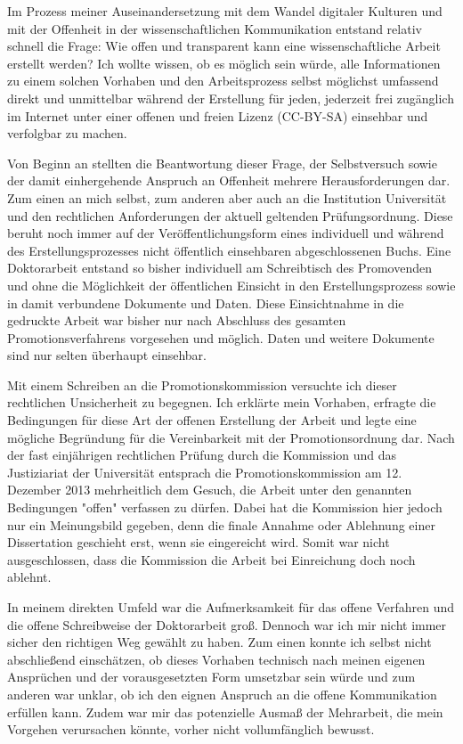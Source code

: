 Im Prozess meiner Auseinandersetzung mit dem Wandel digitaler Kulturen und mit der Offenheit in der wissenschaftlichen Kommunikation entstand relativ schnell die Frage: Wie offen und transparent kann eine wissenschaftliche Arbeit erstellt werden? Ich wollte wissen, ob es möglich sein würde, alle Informationen zu einem solchen Vorhaben und den Arbeitsprozess selbst möglichst umfassend direkt und unmittelbar während der Erstellung für jeden, jederzeit frei zugänglich im Internet unter einer offenen und freien Lizenz (CC-BY-SA) einsehbar und verfolgbar zu machen.

Von Beginn an stellten die Beantwortung dieser Frage, der Selbstversuch sowie der damit einhergehende Anspruch an Offenheit mehrere Herausforderungen dar. Zum einen an mich selbst, zum anderen aber auch an die Institution Universität und den rechtlichen Anforderungen der aktuell geltenden Prüfungsordnung. Diese beruht noch immer auf der Veröffentlichungsform eines individuell und während des Erstellungsprozesses nicht öffentlich einsehbaren abgeschlossenen Buchs. Eine Doktorarbeit entstand so bisher individuell am Schreibtisch des Promovenden und ohne die Möglichkeit der öffentlichen Einsicht in den Erstellungsprozess sowie in damit verbundene Dokumente und Daten. Diese Einsichtnahme in die gedruckte Arbeit war bisher nur nach Abschluss des gesamten Promotionsverfahrens vorgesehen und möglich. Daten und weitere Dokumente sind nur selten überhaupt einsehbar.

Mit einem Schreiben an die Promotionskommission versuchte ich dieser rechtlichen Unsicherheit zu begegnen. Ich erklärte mein Vorhaben, erfragte die Bedingungen für diese Art der offenen Erstellung der Arbeit und legte eine mögliche Begründung für die Vereinbarkeit mit der Promotionsordnung dar. Nach der fast einjährigen rechtlichen Prüfung durch die Kommission und das Justiziariat der Universität entsprach die Promotionskommission am 12. Dezember 2013 mehrheitlich dem Gesuch, die Arbeit unter den genannten Bedingungen "offen" verfassen zu dürfen. Dabei hat die Kommission hier jedoch nur ein Meinungsbild gegeben, denn die finale Annahme oder Ablehnung einer Dissertation geschieht erst, wenn sie eingereicht wird. Somit war nicht ausgeschlossen, dass die Kommission die Arbeit bei Einreichung doch noch ablehnt.

In meinem direkten Umfeld war die Aufmerksamkeit für das offene Verfahren und die offene Schreibweise der Doktorarbeit groß. Dennoch war ich mir nicht immer sicher den richtigen Weg gewählt zu haben. Zum einen konnte ich selbst nicht abschließend einschätzen, ob dieses Vorhaben technisch nach meinen eigenen Ansprüchen und der vorausgesetzten Form umsetzbar sein würde und zum anderen war unklar, ob ich den eignen Anspruch an die offene Kommunikation erfüllen kann. Zudem war mir das potenzielle Ausmaß der Mehrarbeit, die mein Vorgehen verursachen könnte, vorher nicht vollumfänglich bewusst.

